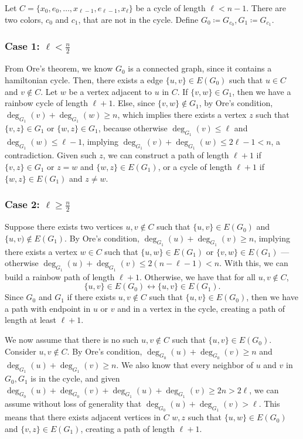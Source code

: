 Let \( C = \{x_0, e_0, \dots, x_{\ell-1}, e_{\ell-1}, x_{\ell}\} \) be a cycle of length \( \ell < n - 1 \).
There are two colors, $c_0$ and $c_1$, that are not in the cycle. Define \(G_0 \coloneqq G_{c_0}, G_1 \coloneqq G_{c_1} \).

\subsubsection{Case 1: \( \ell < \frac{n}{2} \)}

From Ore's theorem, we know \(G_0\) is a connected graph, since it contains a hamiltonian cycle. 
Then, there exists a edge \( \{u, v\} \in E(G_0) \) such that \( u \in C \) and \( v \not\in C \). 
Let \(w\) be a vertex adjacent to \(u\) in \(C\). 
If \(\{v, w\} \in G_1\), then we have a rainbow cycle of length \( \ell+1 \). 
Else, since \( \{v, w\} \not\in G_1 \), by Ore's condition, \( \deg_{G_1}(v) + \deg_{G_1}(w) \geq n \),
which implies there exists a vertex \( z \) such that \( \{v, z\} \in G_1 \) or \( \{w, z\} \in G_1 \), because otherwise
\( \deg_{G_1}(v) \leq \ell \) and \( \deg_{G_1}(w) \leq \ell - 1 \), implying 
\( \deg_{G_1}(v) + \deg_{G_1}(w) \leq 2\ell - 1 < n \), a contradiction.
Given such \(z\), we can construct a path of length \( \ell+1 \) if \( \{v, z\} \in G_1 \) or 
\( z = w \) and \( \{w, z\} \in E(G_1) \), or a cycle of length \( \ell+1 \) if \( \{w, z\} \in E(G_1) \) and \(z \neq w\).

\subsubsection{Case 2: \( \ell \geq \frac{n}{2} \)}

Suppose there exists two vertices \( u, v \not\in C \) such that \( \{u, v\} \in E(G_0) \) and \( \{u, v) \not\in E(G_1) \).
By Ore's condition, 
\( \deg_{G_1}(u) + \deg_{G_1}(v) \geq n \), 
implying there exists a vertex \( w \in C \) such that \( \{u, w\} \in E(G_1) \) or \( \{v, w\} \in E(G_1) \) 
--- otherwise \( \deg_{G_1}(u) + \deg_{G_1}(v) \leq 2 (n - \ell - 1) < n \).
With this, we can build a rainbow path of length \( \ell+1 \).
Otherwise, we have that for all \( u, v \not\in C \), 
\[ \{u, v\} \in E(G_0) \leftrightarrow \{u, v\} \in E(G_1). \]
Since \(G_0\) and \(G_1\) if there exists \(u, v \not\in C\) such that \( \{u, v\} \in E(G_0) \), 
then we have a path with endpoint in \(u\) or \(v\) and in a vertex in the cycle, creating a path of length at 
least \( \ell + 1 \).

We now assume that there is no such \(u, v \not \in C\) such that \( \{u, v\} \in E(G_0) \).
Consider \( u, v \not\in C \). By Ore's condition, 
\( \deg_{G_0}(u) + \deg_{G_0}(v) \geq n \) and \( \deg_{G_1}(u) + \deg_{G_1}(v) \geq n \). 
We also know that every neighbor of \(u\) and \(v\) in \(G_0, G_1\) is in the cycle, and
given \( \deg_{G_0}(u) + \deg_{G_0}(v) + \deg_{G_1}(u) + \deg_{G_1}(v) \geq 2n > 2\ell \), we 
can assume without loss of generality that \( \deg_{G_0}(u) + \deg_{G_1}(v) > \ell \).
This means that there exists adjacent vertices in \(C\) \(w, z\) such that
\( \{u, w\} \in E(G_0) \) and \( \{v, z\} \in E(G_1) \), creating a path of length \( \ell+1 \).